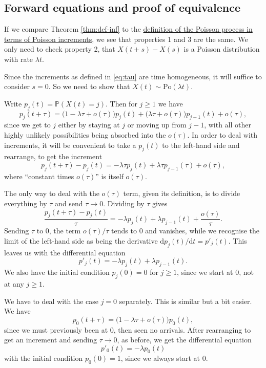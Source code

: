 \documentclass[
  a4paper,
]{article}
\theoremstyle{definition}
\theoremstyle{definition}
\theoremstyle{definition}
\theoremstyle{remark}
\begin{document}
\hypertarget{forward}{%
\subsection{Forward equations and proof of equivalence}\label{forward}}

If we compare Theorem \ref{thm:def-inf} to the \protect\hyperlink{thm:ux5cux23poisson-def-1}{definition of the Poisson process in terms of Poisson increments}, we see that properties 1 and 3 are the same. We only need to check property 2, that \(X(t+s) - X(s)\) is a Poisson distribution with rate \(\lambda t\).

Since the increments as defined in \eqref{eq:tau} are time homogeneous, it will suffice to consider \(s = 0\). So we need to show that \(X(t) \sim \text{Po}(\lambda t)\).

Write \(p_j(t) = \mathbb P(X(t) = j)\). Then for \(j \geq 1\) we have
\[ p_j(t + \tau) = \big(1 - \lambda\tau + o(\tau)\big)p_j(t) + \big(\lambda\tau + o(\tau)\big) p_{j-1}(t) + o(\tau) , \]
since we get to \(j\) either by staying at \(j\) or moving up from \(j-1\), with all other highly unlikely possibilities being absorbed into the \(o(\tau)\). In order to deal with increments, it will be convenient to take a \(p_{j}(t)\) to the left-hand side and rearrange, to get the increment
\[ p_j(t + \tau) - p_j(t) = -\lambda\tau p_j(t) + \lambda\tau p_{j-1}(\tau) + o(\tau) , \]
where ``constant times \(o(\tau)\)'' is itself \(o(\tau)\).

The only way to deal with the \(o(\tau)\) term, given its definition, is to divide everything by \(\tau\) and send \(\tau \to 0\). Dividing by \(\tau\) gives
\[ \frac{p_j(t + \tau) - p_j(t)}{\tau} = -\lambda p_j(t) + \lambda p_{j-1}(t) + \frac{o(\tau)}{\tau} . \]
Sending \(\tau\) to 0, the term \(o(\tau)/\tau\) tends to 0 and vanishes, while we recognise the limit of the left-hand side as being the derivative \(\mathrm d p_j(t) / \mathrm d t = p'_j(t)\).
This leaves us with the differential equation
\[ p'_j(t) = -\lambda p_j(t) + \lambda p_{j-1}(t) . \]
We also have the initial condition \(p_j(0) = 0\) for \(j \geq 1\), since we start at 0, not at any \(j \geq 1\).

We have to deal with the case \(j = 0\) separately. This is similar but a bit easier. We have
\[ p_0(t + \tau) = \big(1 - \lambda\tau + o(\tau)\big)p_0(t) , \]
since we must previously been at 0, then seen no arrivals.
After rearranging to get an increment and sending \(\tau \to 0\), as before, we get the differential equation
\[ p'_0(t) = -\lambda p_0(t) \]
with the initial condition \(p_0(0) = 1\), since we always start at 0.
\end{document}
